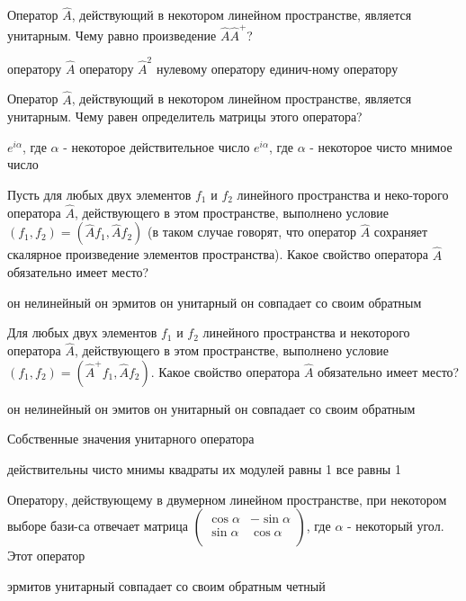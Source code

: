 \documentclass[11pt,a4paper]{exam}
\begin{document}
\begin{questions}
\question Оператор $\hat{A}$, действующий в некотором линейном пространстве, является унитарным. Чему равно произведение $\hat{A}{{\hat{A}}^{+}}$?
\begin{choices}
\choice оператору $\hat{A}$   
\choice оператору ${{\hat{A}}^{2}}$ 
\choice нулевому оператору 
\choice единич-ному оператору
\end{choices}

\question Оператор $\hat{A}$, действующий в некотором линейном пространстве, является унитарным. Чему равен определитель матрицы этого оператора?
\begin{choices}
\choice ${{e}^{i\alpha }}$, где $\alpha $ - некоторое действительное число    
\choice ${{e}^{i\alpha }}$, где $\alpha $ - некоторое чисто мнимое число
\end{choices}

\question Пусть для любых двух элементов ${{f}_{1}}$ и ${{f}_{2}}$ линейного пространства и неко-торого оператора $\hat{A}$, действующего в этом пространстве, выполнено условие $({{f}_{1}},{{f}_{2}})=(\hat{A}{{f}_{1}},\hat{A}{{f}_{2}})$ (в таком случае говорят, что оператор $\hat{A}$ сохраняет скалярное произведение элементов пространства). Какое свойство оператора $\hat{A}$ обязательно имеет место?
\begin{choices}
\choice он нелинейный      
\choice он эрмитов     
\choice он унитарный     
\choice он совпадает со своим обратным
\end{choices}

\question Для любых двух элементов ${{f}_{1}}$ и ${{f}_{2}}$ линейного пространства и некоторого оператора $\hat{A}$, действующего в этом пространстве, выполнено условие $({{f}_{1}},{{f}_{2}})=({{\hat{A}}^{+}}{{f}_{1}},\hat{A}{{f}_{2}})$. Какое свойство оператора $\hat{A}$ обязательно имеет место?
\begin{choices}
\choice он нелинейный       
\choice он эмитов   
\choice он унитарный     
\choice он совпадает со своим обратным
\end{choices}

\question Собственные значения унитарного оператора
\begin{choices}
\choice действительны            
\choice чисто мнимы
\choice квадраты их модулей равны 1    
\choice все равны 1
\end{choices}

\question Оператору, действующему в двумерном линейном пространстве, при некотором выборе бази-са отвечает матрица $\left( \begin{matrix}
   \cos \alpha  & -\sin \alpha   \\
   \sin \alpha  & \cos \alpha   \\
\end{matrix} \right)$, где $\alpha $ - некоторый угол. Этот оператор
\begin{choices}
\choice эрмитов      
\choice унитарный    
\choice совпадает со своим обратным    
\choice четный
\end{choices}


\end{questions}
\end{document}
